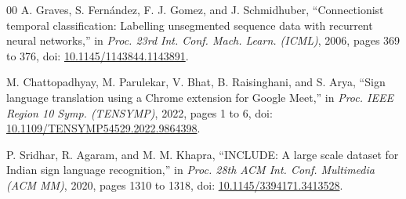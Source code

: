 \documentclass[conference]{IEEEtran}
\begin{document}
\begin{thebibliography}{00}
A. Graves, S. Fern{\'a}ndez, F. J. Gomez, and J. Schmidhuber,
``Connectionist temporal classification: Labelling unsegmented sequence data with recurrent neural networks,''
in \textit{Proc. 23rd Int. Conf. Mach. Learn. (ICML)}, 2006, pages 369 to 376,
doi: \href{https://doi.org/10.1145/1143844.1143891}{10.1145/1143844.1143891}.

M. Chattopadhyay, M. Parulekar, V. Bhat, B. Raisinghani, and S. Arya,
``Sign language translation using a Chrome extension for Google Meet,''
in \textit{Proc. IEEE Region 10 Symp. (TENSYMP)}, 2022, pages 1 to 6,
doi: \href{https://doi.org/10.1109/TENSYMP54529.2022.9864398}{10.1109/TENSYMP54529.2022.9864398}.

P. Sridhar, R. Agaram, and M. M. Khapra,
``INCLUDE: A large scale dataset for Indian sign language recognition,''
in \textit{Proc. 28th ACM Int. Conf. Multimedia (ACM MM)}, 2020, pages 1310 to 1318,
doi: \href{https://doi.org/10.1145/3394171.3413528}{10.1145/3394171.3413528}.

\end{thebibliography}
\end{document}
